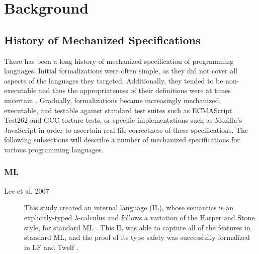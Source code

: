 \documentclass[a4paper,11pt,twoside]{report}
\begin{document}
\chapter{Background}
\section{History of Mechanized Specifications}\label{sec:hist}
There has been a long history of mechanized specification of programming languages. Initial formalizations were often simple, as they did not cover all aspects of the languages they targeted. Additionally, they tended to be non-executable and thus the appropriateness of their definitions were at times uncertain \cite{Ellison:2012}. Gradually, formalizations became increasingly mechanized, executable, and testable against standard test suites such as ECMAScript Test262 and GCC torture tests, or specific implementations such as Mozilla's JavaScript in order to ascertain real life correctness of these specifications. The following subsections will describe a number of mechanized specifications for various programming languages.

\subsection{ML}
\begin{description}
\item[Lee et al. 2007] This study created an internal language (IL), whose semantics is an explicitly-typed $\lambda$-calculus and follows a variation of the Harper and Stone\cite{Harper:2000} style, for standard ML \cite{Lee:2007}. This IL was able to capture all of the features in standard ML, and the proof of its type safety was successfully formalized in LF \cite{Harper:1993} and Twelf \cite{Pfenning98guide}.
\end{description}
\end{document}
